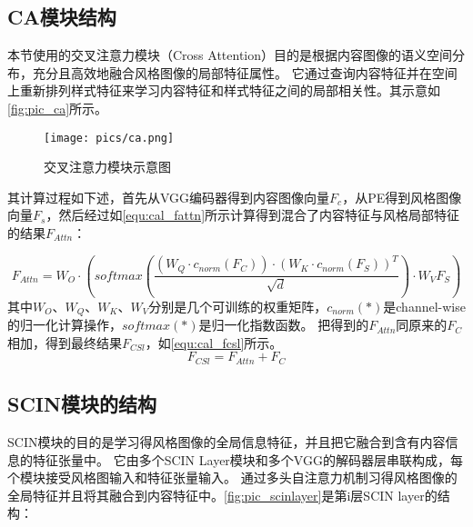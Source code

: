 \subsection{CA模块结构}
本节使用的交叉注意力模块（Cross Attention）目的是根据内容图像的语义空间分布，充分且高效地融合风格图像的局部特征属性。
它通过查询内容特征并在空间上重新排列样式特征来学习内容特征和样式特征之间的局部相关性。其示意如\autoref{fig:pic_ca}所示。
\begin{figure}[htbp]
    \centering
    \texttt{[image: pics/ca.png]}
    \caption{\label{fig:pic_ca}交叉注意力模块示意图}
\end{figure}
其计算过程如下述，首先从VGG编码器得到内容图像向量$F_c$，从PE得到风格图像向量$F_s$，然后经过如\autoref{equ:cal_fattn}所示计算得到混合了内容特征与风格局部特征的结果$F_{Attn}$：

\begin{equation}
    \label{equ:cal_fattn}
    F_{Attn}=W_O\cdot(softmax\left(\frac{(W_Q\cdot c_{norm}(F_C))\cdot(W_K\cdot c_{norm}(F_S))^T}{\sqrt{d}}\right)\cdot W_VF_S)
\end{equation}
其中$W_O$、$W_Q$、$W_K$、$W_V$分别是几个可训练的权重矩阵，$c_{norm} (*)$是channel-wise的归一化计算操作，$softmax(*)$是归一化指数函数。
把得到的$F_{Attn}$同原来的$F_C$相加，得到最终结果$F_{CSl}$，如\autoref{equ:cal_fcsl}所示。
\begin{equation}
    \label{equ:cal_fcsl}
    F_{CSl}=F_{Attn}+F_C
\end{equation}

\subsection{SCIN模块的结构}
SCIN模块的目的是学习得风格图像的全局信息特征，并且把它融合到含有内容信息的特征张量中。
它由多个SCIN Layer模块和多个VGG的解码器层串联构成，每个模块接受风格图输入和特征张量输入。
通过多头自注意力机制习得风格图像的全局特征并且将其融合到内容特征中。\autoref{fig:pic_scinlayer}是第i层SCIN layer的结构：

